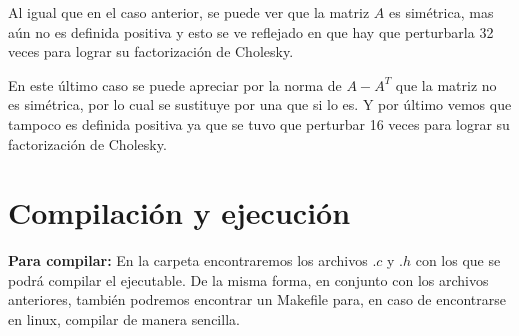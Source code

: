 \documentclass[12pt]{article}
\begin{document}
Al igual que en el caso anterior, se puede ver que la matriz $A$ es simétrica, mas aún no es definida positiva y esto se ve reflejado en que hay que perturbarla 32 veces para lograr su factorización de Cholesky.

\begin{figure}[H]
	\centering
	\hfill
\end{figure}

En este último caso se puede apreciar por la norma de $A - A^T$ que la matriz no es simétrica, por lo cual se sustituye por una que si lo es. Y por último vemos que tampoco es definida positiva ya que se tuvo que perturbar 16 veces para lograr su factorización de Cholesky.

\section{Compilación y ejecución}
\textbf{Para compilar:} En la carpeta encontraremos los archivos $.c$ y $.h$ con los que se podrá compilar el ejecutable. De la misma forma, en conjunto con los archivos anteriores, también podremos encontrar un Makefile para, en caso de encontrarse en linux, compilar de manera sencilla.
\end{document}
